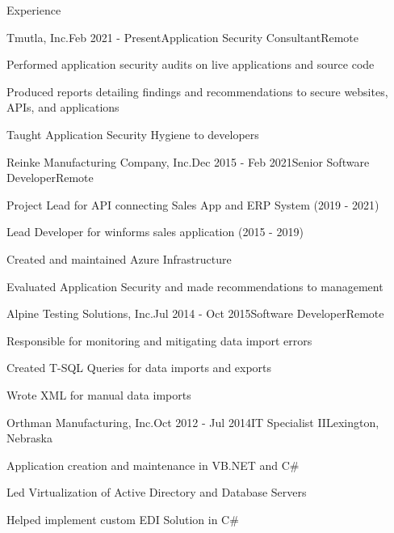 \documentclass{resume} %
\begin{document}

\begin{rSection}{Experience}

\begin{rSubsection}{Tmutla, Inc.}{Feb 2021 - Present}{Application Security Consultant}{Remote}
\item Performed application security audits on live applications and source code
\item Produced reports detailing findings and recommendations to secure websites, APIs, and applications
\item Taught Application Security Hygiene to developers
\end{rSubsection}

\begin{rSubsection}{Reinke Manufacturing Company, Inc.}{Dec 2015 - Feb 2021}{Senior Software Developer}{Remote}
\item Project Lead for API connecting Sales App and ERP System (2019 - 2021)
\item Lead Developer for winforms sales application (2015 - 2019)
\item Created and maintained Azure Infrastructure
\item Evaluated Application Security and made recommendations to management
\end{rSubsection}

\begin{rSubsection}{Alpine Testing Solutions, Inc.}{Jul 2014 - Oct 2015}{Software Developer}{Remote}
\item Responsible for monitoring and mitigating data import errors 
\item Created T-SQL Queries for data imports and exports
\item Wrote XML for manual data imports
\end{rSubsection}

\begin{rSubsection}{Orthman Manufacturing, Inc.}{Oct 2012 - Jul 2014}{IT Specialist II}{Lexington, Nebraska}
\item Application creation and maintenance in VB.NET and C\#
\item Led Virtualization of Active Directory and Database Servers
\item Helped implement custom EDI Solution in C\#


\end{rSubsection}
\end{rSection}
\end{document}
